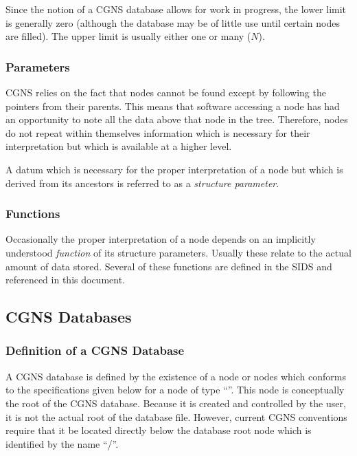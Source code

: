 Since the notion of a CGNS database allows for work in progress, the
lower limit is generally zero (although the database may be of little
use until certain nodes are filled). The upper limit is usually either
one or many ($N$).

\subsubsection{Parameters}

CGNS relies on the fact that nodes cannot be found except by
following the pointers from their parents.  This means that software
accessing a node has had an opportunity to note all the data above that
node in the tree. Therefore, nodes do not repeat within themselves
information which is necessary for their interpretation but which is
available at a higher level.

A datum which is necessary for the proper interpretation of a
node but which is derived from its ancestors is referred to as a
\textit{structure parameter}.

\subsubsection{Functions}
\label{s:functions}

Occasionally the proper interpretation of a node depends on
an implicitly understood \emph{function} of its structure
parameters. Usually these relate to the actual amount of data
stored. Several of these functions are defined in the SIDS and
referenced in this document.

\subsection{CGNS Databases}
\label{s:cgns_databases}

\subsubsection{Definition of a CGNS Database}

A CGNS database is defined by the existence of a
node or nodes which conforms to the specifications
given below for a node of type ``''.
This node is conceptually the root of the CGNS database. Because it is
created and controlled by the user, it is not the actual root of the
database file.
However, current CGNS conventions require that it be located directly below
the database root node which is identified by the name ``/''.

